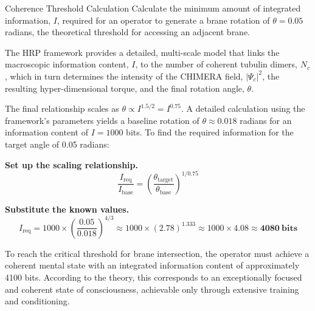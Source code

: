 \begin{workedexample}{Coherence Threshold Calculation}
    Calculate the minimum amount of integrated information, \(I\), required for an operator to generate a brane rotation of \(\theta = 0.05\) radians, the theoretical threshold for accessing an adjacent brane.

    The HRP framework provides a detailed, multi-scale model that links the macroscopic information content, \(I\), to the number of coherent tubulin dimers, \(N_c\), which in turn determines the intensity of the CHIMERA field, \(|\Psi_c|^2\), the resulting hyper-dimensional torque, and the final rotation angle, \(\theta\).
    
    The final relationship scales as \(\theta \propto I^{1.5/2} = I^{0.75}\). A detailed calculation using the framework's parameters yields a baseline rotation of \(\theta \approx 0.018\) radians for an information content of \(I = 1000\) bits. To find the required information for the target angle of 0.05 radians:
    
    \begin{derivationsteps}
        \step \textbf{Set up the scaling relationship.}
        \[ \frac{I_{\text{req}}}{I_{\text{base}}} = \left(\frac{\theta_{\text{target}}}{\theta_{\text{base}}}\right)^{1/0.75} \]

        \step \textbf{Substitute the known values.}
        \[ I_{\text{req}} = 1000 \times \left(\frac{0.05}{0.018}\right)^{4/3} \approx 1000 \times (2.78)^{1.333} \approx 1000 \times 4.08 \approx \mathbf{4080~\text{bits}} \]
    \end{derivationsteps}

    To reach the critical threshold for brane intersection, the operator must achieve a coherent mental state with an integrated information content of approximately 4100 bits. According to the theory, this corresponds to an exceptionally focused and coherent state of consciousness, achievable only through extensive training and conditioning.
\end{workedexample}

